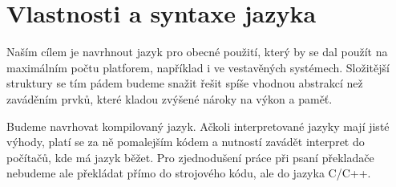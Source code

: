 \begin{comment}
Mou hlavní motivací je nespokojenost se stávajícími programovacími jazyky. Programování mám jako koníčka už od nějakých dvanácti let, a tak jsem ještě před nastoupením na FIT získal nějaké zkušenosti z psaní aplikací v Object Pascalu (Delphi), C++ (Qt, SDL + OpenGL) a PHP (webové aplikace). FIT pak můj repertoár (i když jen rámcově) rozšířil na valnou většinu dnes používaných jazyků. Bohužel jsem ale nenarazil na žádný, který by splňoval mé požadavky. Rozhodl jsem se tedy využít nutnost napsání bakalářské práce k~uskutečnění mého dlouholetého snu.

\paragraph{Jazyk D}
Mému srdci nejbližší jazyk, na který jsem ve svém pátrání narazil, byl jazyk D. Jedná se o kompilovaný jazyk vycházející z C++ (binárky jsou do jisté míry kompatibilní) s~velice podobnou syntaxí. Největší rozdíly jsou modulový systém\footnote{\url{http://dlang.org/spec/module.html}} (zdrojový kód je rozdělen do modulů, které se vzájemně, i rekurzivně, importují; odpadá nutnost psát hlavičkové soubory), značně rozšířená funkčnost metaprogramování s šablonami a~rozšířená schopnost vykonávat funkce za doby kompilace.

D mi byl velikou inspirací při navrhování mého jazyka. Bohužel i v D jsem narazil na strop možnosti (ačkoli byl značně výš než třeba v C++), kdy některé věci nešly napsat tak jednoduše, jak bych chtěl. Tento jazyk však dokazuje, že tato bariéra může být mnohem dál. Já ji chci ve svém jazyku ještě více posunout. 
\end{comment}

\chapter{Vlastnosti a syntaxe jazyka} \label{chap:languageProps}
Naším cílem je navrhnout jazyk pro obecné použití, který by se dal použít na maximálním počtu platforem, například i ve vestavěných systémech. Složitější struktury se tím pádem budeme snažit řešit spíše vhodnou abstrakcí než zaváděním prvků, které kladou zvýšené nároky na výkon a paměť.

Budeme navrhovat kompilovaný jazyk. Ačkoli interpretované jazyky mají jisté výhody, platí se za ně pomalejším kódem a nutností zavádět interpret do počítačů, kde má jazyk běžet. Pro zjednodušení práce při psaní překladače nebudeme ale překládat přímo do strojového kódu, ale do jazyka C/C++.

